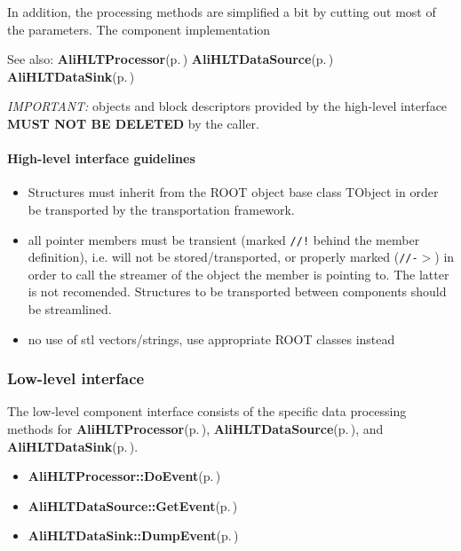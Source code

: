 In addition, the processing methods are simplified a bit by cutting out most of the parameters. The component implementation \begin{Desc}
\item[See also:]{\bf Ali\-HLTProcessor}{\rm (p.\,\pageref{classAliHLTProcessor})} {\bf Ali\-HLTData\-Source}{\rm (p.\,\pageref{classAliHLTDataSource})} {\bf Ali\-HLTData\-Sink}{\rm (p.\,\pageref{classAliHLTDataSink})}\end{Desc}
{\em IMPORTANT:\/} objects and block descriptors provided by the high-level interface {\bf MUST NOT BE DELETED} by the caller.\paragraph{High-level interface guidelines}\label{classAliHLTComponent_alihltcomponent-high-level-int-guidelines}
\begin{itemize}
\item Structures must inherit from the ROOT object base class TObject in order be transported by the transportation framework.\item all pointer members must be transient (marked {\tt //!} behind the member definition), i.e. will not be stored/transported, or properly marked ({\tt //-$>$}) in order to call the streamer of the object the member is pointing to. The latter is not recomended. Structures to be transported between components should be streamlined.\item no use of stl vectors/strings, use appropriate ROOT classes instead\end{itemize}
\subsubsection{Low-level interface}\label{classAliHLTComponent_alihltcomponent-low-level-interface}
The low-level component interface consists of the specific data processing methods for {\bf Ali\-HLTProcessor}{\rm (p.\,\pageref{classAliHLTProcessor})}, {\bf Ali\-HLTData\-Source}{\rm (p.\,\pageref{classAliHLTDataSource})}, and {\bf Ali\-HLTData\-Sink}{\rm (p.\,\pageref{classAliHLTDataSink})}.\begin{itemize}
\item {\bf Ali\-HLTProcessor::Do\-Event}{\rm (p.\,\pageref{classAliHLTProcessor_d0})}\item {\bf Ali\-HLTData\-Source::Get\-Event}{\rm (p.\,\pageref{classAliHLTDataSource_d0})}\item {\bf Ali\-HLTData\-Sink::Dump\-Event}{\rm (p.\,\pageref{classAliHLTDataSink_d0})}\end{itemize}
